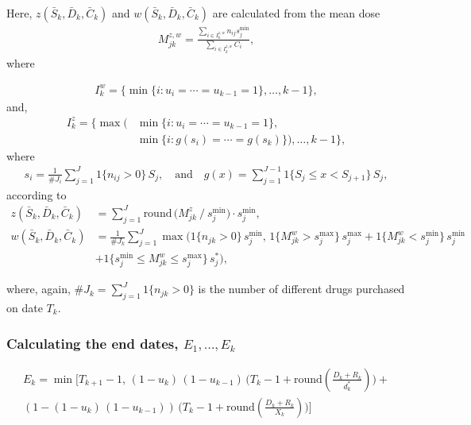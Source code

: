 \documentclass{article}
\newcommand{\one}{1}
\newcommand{\str}{S}
\newcommand{\smin}{s^{\min}}
\newcommand{\smax}{s^{\max}}
\newcommand{\styp}{s^{*}}
\begin{document}
Here, ${z}( \bar{S}_{k}, \bar{D}_{k}, \bar{{C}}_{k} )$ and
${w}( \bar{S}_{k}, \bar{D}_{k}, \bar{{C}}_{k} )$ are
calculated from the mean dose 
\begin{align*}
M^{{z}, {w}}_{jk} = \frac{\sum_{i \in {I}^{z, w}_{k}}n_{ij}\smin_j}{\sum_{i \in {I}^{{z}, {w}}_{k}} {C}_i},
\end{align*}
where

\begin{align*}
{I}^{{w}}_{k} = \big\lbrace \min \lbrace i : u_i = \cdots = u_{k-1} =1 \rbrace, \ldots, k-1\big\rbrace,
\end{align*}
and, 
\begin{align*}
{I}^{{z}}_{k} = \big\lbrace \max \big( &\min \lbrace i : u_i = \cdots = u_{k-1} =1 \rbrace, \\
&  \min \lbrace i : g( s_i) = \cdots =g( s_{k})  \rbrace \big), \ldots, k-1 \big\rbrace,
\end{align*}
where 
\begin{align*}
s_i = \frac{1}{\# J_i}  \sum_{j=1}^J \one \lbrace n_{ij} > 0\rbrace\, \str_{j}, \quad \text{and} \quad g(x) = \sum_{j=1}^{J-1} \one \lbrace S_{j} \le x<  S_{j+1} \rbrace\, S_{j}, 
\end{align*}
according to
 \begin{align*}
{z}( \bar{S}_{k}, \bar{D}_{k}, \bar{{C}}_{k} )& = \sum_{j=1}^J \text{round}\,\Big ( M_{jk}^{{z}} \mathbin{/} \smin_{j}\Big) \cdot \smin_{j}, \\
{w}( \bar{S}_{k}, \bar{D}_{k}, \bar{{C}}_{k} )& = \frac{1}{\#J_k}\sum_{j=1}^J\max \Big(\one \lbrace n_{jk} >0\rbrace \, \smin_j, \, \one \lbrace M_{jk}^{{w}} > \smax_{j} \rbrace\, \smax_{j} + \one\lbrace M_{jk}^{{w}} < \smin_{j} \rbrace\, 
 \smin_{j}\\
& + \one \lbrace \smin_{j} \le M_{jk}^{{w}} \le \smax_{j} \rbrace \,\styp_{j}\Big),
\end{align*}

where, again, \(\#J_k= \sum_{j= 1}^J \one\lbrace n_{jk} > 0\rbrace\) is the number of different drugs purchased on date \(T_k\).\\


\subsubsection{Calculating the end dates, \({E}_1,\ldots, {E}_{k}\)}
\label{sec:orgheadline5}

\begin{align*}
{E}_{k}= \min \bigg[ {T}_{k+1}-1, \, (1-u_{k})\, (1-u_{k-1})  \, \bigg( {T}_{k} - 1+ \text{round} \left( \tfrac{D_{k} + {R}_{k}}{d_{k}^*} \right)\bigg) + \\
 \left(1-(1-u_{k})\, (1-u_{k-1}) \right)  \, \bigg( {T}_{k} - 1+ \text{round} \left( \tfrac{D_{k} + {R}_{k}}{{X}_{k}} \right)\bigg)\bigg]
\end{align*}
\end{document}
